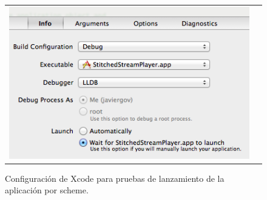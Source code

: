 \begin{figure}[H]
	\centering
	\begin{tabular}{cc}
	\includegraphics[scale=0.7]{imgs/xcode-debug-wait.png}
	\end{tabular}
	\caption{Configuración de Xcode para pruebas de lanzamiento de la aplicación por scheme.}
	\label{fig:xcode-debug-wait}
\end{figure}



	
